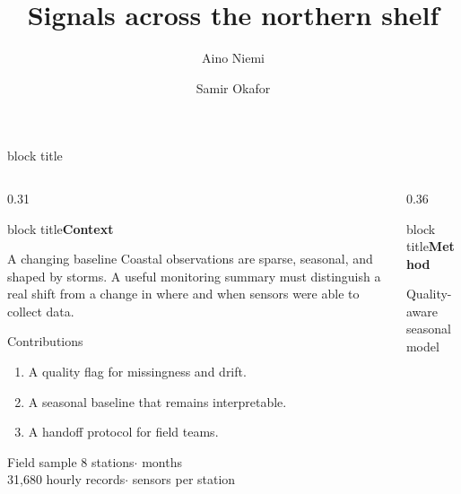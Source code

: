 \documentclass[final]{beamer}
\title{Signals across the northern shelf}
\author{Aino Niemi \and Samir Okafor}
\institute{Arctic Data Observatory \quad \texttt{hello@example.org}}
\newcommand{\stripe}[1]{\begin{beamercolorbox}[wd=\linewidth,sep=0.55em]{block title}\Large\bfseries #1\end{beamercolorbox}\vspace{0.35em}}
\begin{document}
\begin{frame}[t]
  \begin{beamercolorbox}[wd=\paperwidth,sep=1.5em,leftskip=2em,rightskip=2em]{block title}
    \hspace{0.5em}{\fontsize{48}{54}\selectfont\bfseries\inserttitle}\par\vspace{0.35em}
    {\Large\insertauthor}\hfill{\large\insertinstitute}
  \end{beamercolorbox}\vspace{1em}
  \begin{columns}[t,totalwidth=0.96\paperwidth]
    \begin{column}{0.31\paperwidth}
      \stripe{Context}
      \begin{block}{A changing baseline}
        Coastal observations are sparse, seasonal, and shaped by storms. A
        useful monitoring summary must distinguish a real shift from a change
        in where and when sensors were able to collect data.
      \end{block}
      \begin{block}{Contributions}
        \begin{enumerate}\itemsep0.35em
          \item A quality flag for missingness and drift.
          \item A seasonal baseline that remains interpretable.
          \item A handoff protocol for field teams.
        \end{enumerate}
      \end{block}
      \begin{block}{Field sample}
        8 stations\quad $\cdot$ months\\
        31,680 hourly records\quad $\cdot$ sensors per station
      \end{block}
    \end{column}
    \begin{column}{0.36\paperwidth}
      \stripe{Method}
      \begin{block}{Quality-aware seasonal model}
        \centering
\end{block}
\end{column}
\end{columns}
\end{frame}
\end{document}
